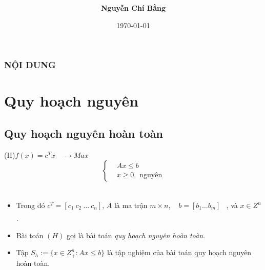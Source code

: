 \documentclass{beamer}
\begin{document}
\title[]{\fontsize{13pt}{10pt}\selectfont {\bf \LARGE Phương pháp nhánh cận}\\}
\author[]{\bf Nguyễn Chí Bằng \\}
\small{\date{\today}}
\begin{frame}
\begin{center}
\end{center}
\titlepage
\end{frame}

\begin{frame}
    \frametitle{NỘI DUNG}
    \tableofcontents
\end{frame}

\section{Quy hoạch nguyên}
\subsection{Quy hoạch nguyên hoàn toàn}
\begin{frame}
    \begin{center}                    
        \big(H\big)\quad $f(x)=c^Tx \quad \longrightarrow Max$ \\
        \[\left\{\begin{aligned}
            &Ax \leq  b \\
            &x\geq 0, \text{ nguyên}
        \end{aligned}\right.\]\\
    \end{center}
    \begin{itemize}
    \item Trong đó $c^T=[c_1 \: c_2 \: \ldots \: c_n]$, $A$ là ma trận $m\times n$, $ \begin{align}\begin{split} b=[b_1 \ldots b_m] \end{split}\end{align}$, và $x\in Z^n$.
    \item Bài toán $(H)$ gọi là bài toán \textit{quy hoạch nguyên hoàn toàn.}
    \item Tập $S_h:=\{x\in Z^n_+: Ax\leq b\}$ là tập nghiệm của bài toán quy hoạch nguyên hoàn toàn.
    \end{itemize}
\end{frame}
\end{document}
